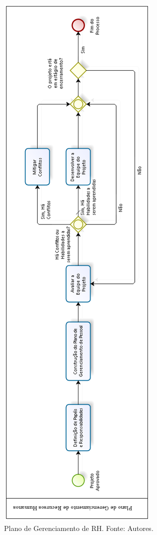 \begin{figure}[htpb!]
    \centering
    \includegraphics[scale= 0.7]{figuras/rh.png}
    \caption[RH]{Plano de Gerenciamento de RH. Fonte: Autores.}
    \label{fig:rh}
\end{figure}

